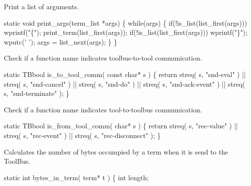 
Print a list of arguments.

\nwenddocs{}\endmoddef\let\nwnotused=\nwoutput{}
static void print_args(term_list *args)
\{
  while(args) \{
    if(!is_list(list_first(args)))
      wprintf("\{");
    print_term(list_first(args));
    if(!is_list(list_first(args)))
      wprintf("\}");
    wputc(' ');
    args = list_next(args);
  \}
\}
\nwendcode{}\nwdocspar


Check if a function name indicates toolbus-to-tool communication.

\nwenddocs{}\endmoddef\let\nwnotused=\nwoutput{}
static TBbool is_to_tool_comm( const char* s )
\{
   return streq( s, "snd-eval" )      || 
          streq( s, "snd-cancel" )    ||
          streq( s, "snd-do" )        || 
          streq( s, "snd-ack-event" ) ||
          streq( s, "snd-terminate" );
\}
\nwendcode{}\nwdocspar


Check if a function name indicates tool-to-toolbus communication.

\nwenddocs{}\endmoddef\let\nwnotused=\nwoutput{}
static TBbool is_from_tool_comm( char* s )
\{
   return streq( s, "rec-value" ) ||  
          streq( s, "rec-event" ) ||
          streq( s, "rec-disconnect" );
\}
\nwendcode{}\nwdocspar


Calculates the number of bytes occumpied by a term when it is send
to the ToolBus.

\nwenddocs{}\endmoddef\let\nwnotused=\nwoutput{}
static int bytes_in_term( term* t )
\{ 
   int length;
   
